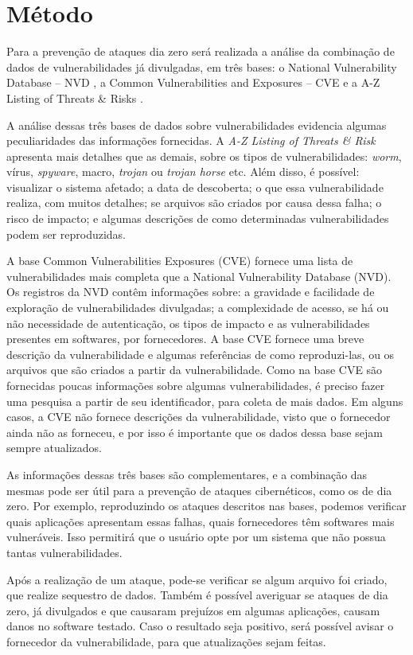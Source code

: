 \section{Método}
Para a prevenção de ataques dia zero será realizada a análise da combinação de dados de vulnerabilidades já divulgadas, em três bases: o National Vulnerability Database – NVD \cite{NIST:2017}, a Common Vulnerabilities and Exposures – CVE \cite{MITRE:2017} e a A-Z Listing of Threats \& Risks \cite{Symantec:2017}.

A análise dessas três bases de dados sobre vulnerabilidades evidencia algumas peculiaridades das informações fornecidas. A \textit{A-Z Listing of Threats \& Risk} apresenta mais detalhes que as demais, sobre os tipos de vulnerabilidades: \textit{worm}, vírus, \textit{spyware}, macro, \textit{trojan} ou \textit{trojan horse} etc. Além disso, é possível: visualizar o sistema afetado; a data de descoberta; o que essa vulnerabilidade realiza, com muitos detalhes; se arquivos são criados por causa dessa falha; o risco de impacto; e algumas descrições de como determinadas vulnerabilidades podem ser reproduzidas.

A base Common Vulnerabilities Exposures (CVE) fornece uma lista de vulnerabilidades mais completa que a National Vulnerability Database (NVD). Os registros da NVD contêm informações sobre: a gravidade e facilidade de exploração de vulnerabilidades divulgadas; a complexidade de acesso, se há ou não necessidade de autenticação, os tipos de impacto e as vulnerabilidades presentes em softwares, por fornecedores. A base CVE fornece uma breve descrição da vulnerabilidade e algumas referências de como reproduzi-las, ou os arquivos que são criados a partir da vulnerabilidade. Como na base CVE são fornecidas poucas informações sobre algumas vulnerabilidades, é preciso fazer uma pesquisa a partir de seu identificador, para coleta de mais dados. Em alguns casos, a CVE não fornece descrições da vulnerabilidade, visto que o fornecedor ainda não as forneceu, e por isso é importante que os dados dessa base sejam sempre atualizados.

As informações dessas três bases são complementares, e a combinação das mesmas pode ser útil para a prevenção de ataques cibernéticos, como os de dia zero. Por exemplo, reproduzindo os ataques descritos nas bases, podemos verificar quais aplicações apresentam essas falhas, quais fornecedores têm softwares mais vulneráveis. Isso permitirá que o usuário opte por um sistema que não possua tantas vulnerabilidades. 

Após a realização de um ataque, pode-se verificar se algum arquivo foi criado, que realize sequestro de dados. Também é possível averiguar se ataques de dia zero, já divulgados e que causaram prejuízos em algumas aplicações, causam danos no software testado. Caso o resultado seja positivo, será possível avisar o fornecedor da vulnerabilidade, para que atualizações sejam feitas.